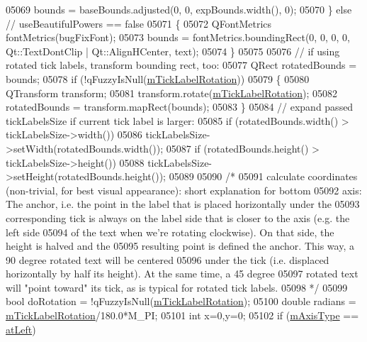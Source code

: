 \begin{DoxyCode}
05069     bounds = baseBounds.adjusted(0, 0, expBounds.width(), 0);
05070   \} \textcolor{keywordflow}{else} \textcolor{comment}{// useBeautifulPowers == false}
05071   \{
05072     QFontMetrics fontMetrics(bugFixFont);
05073     bounds = fontMetrics.boundingRect(0, 0, 0, 0, Qt::TextDontClip | Qt::AlignHCenter, text);
05074   \}
05075   
05076   \textcolor{comment}{// if using rotated tick labels, transform bounding rect, too:}
05077   QRect rotatedBounds = bounds;
05078   \textcolor{keywordflow}{if} (!qFuzzyIsNull(\hyperlink{a00025_a47660c8694884cdb87495bf8b4c8a3b9}{mTickLabelRotation}))
05079   \{
05080     QTransform transform;
05081     transform.rotate(\hyperlink{a00025_a47660c8694884cdb87495bf8b4c8a3b9}{mTickLabelRotation});
05082     rotatedBounds = transform.mapRect(bounds);
05083   \}
05084   \textcolor{comment}{// expand passed tickLabelsSize if current tick label is larger:}
05085   \textcolor{keywordflow}{if} (rotatedBounds.width() > tickLabelsSize->width()) 
05086     tickLabelsSize->setWidth(rotatedBounds.width());
05087   \textcolor{keywordflow}{if} (rotatedBounds.height() > tickLabelsSize->height())
05088     tickLabelsSize->setHeight(rotatedBounds.height());
05089   
05090   \textcolor{comment}{/*}
05091 \textcolor{comment}{    calculate coordinates (non-trivial, for best visual appearance): short explanation for bottom}
05092 \textcolor{comment}{    axis: The anchor, i.e. the point in the label that is placed horizontally under the}
05093 \textcolor{comment}{    corresponding tick is always on the label side that is closer to the axis (e.g. the left side}
05094 \textcolor{comment}{    of the text when we're rotating clockwise). On that side, the height is halved and the}
05095 \textcolor{comment}{    resulting point is defined the anchor. This way, a 90 degree rotated text will be centered}
05096 \textcolor{comment}{    under the tick (i.e. displaced horizontally by half its height). At the same time, a 45 degree}
05097 \textcolor{comment}{    rotated text will "point toward" its tick, as is typical for rotated tick labels.}
05098 \textcolor{comment}{  */}
05099   \textcolor{keywordtype}{bool} doRotation = !qFuzzyIsNull(\hyperlink{a00025_a47660c8694884cdb87495bf8b4c8a3b9}{mTickLabelRotation});
05100   \textcolor{keywordtype}{double} radians = \hyperlink{a00025_a47660c8694884cdb87495bf8b4c8a3b9}{mTickLabelRotation}/180.0*M\_PI;
05101   \textcolor{keywordtype}{int} x=0,y=0;
05102   \textcolor{keywordflow}{if} (\hyperlink{a00025_ae704bf9f2c2b026f08dd4ccad79c616e}{mAxisType} == \hyperlink{a00025_ae2bcc1728b382f10f064612b368bc18aaf84aa6cac6fb6099f54a2cbf7546b730}{atLeft})

\end{DoxyCode}

